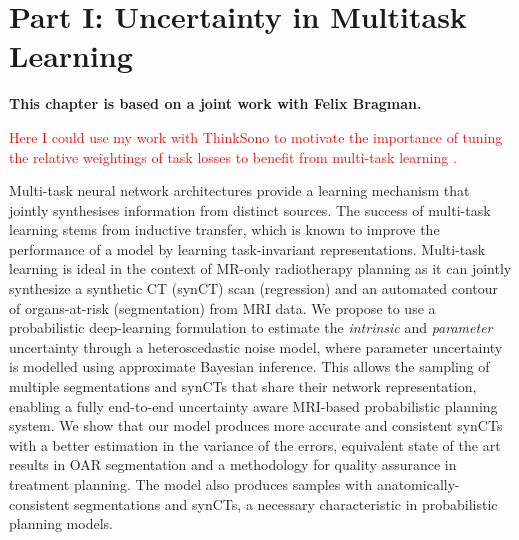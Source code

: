 
\chapter{Part I: Uncertainty in Multitask Learning} \label{chapter:multitaskuncertainty_part1}

\textbf{This chapter is based on a joint work with Felix Bragman.}

\textcolor{red}{Here I could use my work with ThinkSono to motivate the importance of tuning the relative weightings of task losses to benefit from multi-task learning \cite{tanno2018autodvt}.}

Multi-task neural network architectures provide a learning mechanism that jointly synthesises information from distinct sources. The success of multi-task learning stems from inductive transfer, which is known to improve the performance of a model by learning task-invariant representations. Multi-task learning is ideal in the context of MR-only radiotherapy planning as it can jointly synthesize a synthetic CT (synCT) scan (regression) and an automated contour of organs-at-risk (segmentation) from MRI data. We propose to use a probabilistic deep-learning formulation to estimate the \textit{intrinsic} and \textit{parameter} uncertainty through a heteroscedastic noise model, where parameter uncertainty is modelled using approximate Bayesian inference. This allows the sampling of multiple segmentations and synCTs that share their network representation, enabling a fully end-to-end uncertainty aware MRI-based probabilistic planning system. We show that our model produces more accurate and consistent synCTs with a better estimation in the variance of the errors, equivalent state of the art results in OAR segmentation and a methodology for quality assurance in treatment planning. The model also produces samples with anatomically-consistent segmentations and synCTs, a necessary characteristic in probabilistic planning models. 

